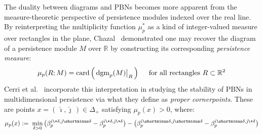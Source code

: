 The duality between diagrams and PBNs becomes more apparent from the measure-theoretic perspective of persistence modules indexed over the real line. 
By reinterpreting the multiplicity function $\mu^\ast_p$ as a kind of integer-valued measure over rectangles in the plane, Chazal~\cite{chazal2016structure} demonstrated one may recover the diagram of a persistence module $M$ over $\mathbb{R}$ by constructing its corresponding \emph{persistence measure}:
\begin{equation}\label{eq:measure}
	\mu_p(R; M) = \mathrm{card}\left( \,
	\restr{\mathrm{dgm}_p(M)}{R} \,
	\right) \quad \text{ for all rectangles } R \subset \mathbb{R}^2 
\end{equation}
Cerri et al.~\cite{cerri2013betti} incorporate this interpretation in studying the stability of PBNs in multidimensional persistence via what they define as \emph{proper cornerpoints}. These are points $x = (\, \hat\imath, \hat\jmath \,) \in \Delta_+$ satisfying $\mu_p(x) > 0$, where:
\begin{equation}\label{eq:pbn_cont}
\mu_p(x) := \; \min_{\delta > 0} \left(\beta_p^{\hat\imath \+ \delta, \hat\jmath  \shortminus \delta} - \beta_p^{\hat\imath \+ \delta, \hat\jmath  \+ \delta} \right) - \left(\beta_p^{\hat\imath \shortminus \delta, \hat\jmath \shortminus \delta} - \beta_p^{\hat\imath \shortminus \delta, \hat\jmath  \+ \delta} \right)
\end{equation}
